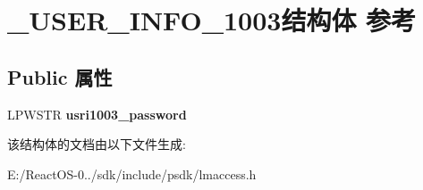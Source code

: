 \hypertarget{struct___u_s_e_r___i_n_f_o__1003}{}\section{\+\_\+\+U\+S\+E\+R\+\_\+\+I\+N\+F\+O\+\_\+1003结构体 参考}
\label{struct___u_s_e_r___i_n_f_o__1003}
\subsection*{Public 属性}
\begin{DoxyCompactItemize}
\item 
\mbox{\label{struct___u_s_e_r___i_n_f_o__1003_a532d9bb527d5fe73738af3ef078c05c2}} 
L\+P\+W\+S\+TR {\bfseries usri1003\+\_\+password}
\end{DoxyCompactItemize}


该结构体的文档由以下文件生成\+:\begin{DoxyCompactItemize}
\item 
E\+:/\+React\+O\+S-\/0../sdk/include/psdk/lmaccess.\+h\end{DoxyCompactItemize}
